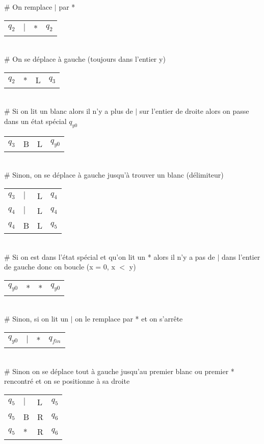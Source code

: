 \documentclass{article}
\begin{document}
\# On remplace $|$ par *

\begin{tabular}{llll}
$q_2$ & $|$ & * & $q_2$
\end{tabular}\\

\# On se déplace à gauche (toujours dans l'entier y)

\begin{tabular}{llll}
$q_2$ & * & L & $q_3$
\end{tabular}\\

\# Si on lit un blanc alors il n'y a plus de $|$ sur l'entier de droite alors on passe dans un état spécial $q_{y0}$ 

\begin{tabular}{llll}
$q_3$ & B & L & $q_{y0}$
\end{tabular}\\

\# Sinon, on se déplace à gauche jusqu'à trouver un blanc (délimiteur)

\begin{tabular}{llll}
$q_3$ & $|$ & L & $q_4$ \\
$q_4$ & $|$ & L & $q_4$ \\
$q_4$ & B & L & $q_5$
\end{tabular}\\

\# Si on est dans l'état spécial et qu'on lit un * alors il n'y a pas de $|$ dans l'entier de gauche donc on boucle (x = 0, x $<$ y)

\begin{tabular}{llll}
$q_{y0}$ & * & * & $q_{y0}$
\end{tabular}\\

\# Sinon, si on lit un $|$ on le remplace par * et on s'arrête

\begin{tabular}{llll}
$q_{y0}$ & $|$ & * & $q_{fin}$
\end{tabular}\\

\# Sinon on se déplace tout à gauche jusqu'au premier blanc ou premier * rencontré et on se positionne à sa droite

\begin{tabular}{llll}
$q_5$ & $|$ & L & $q_5$ \\
$q_5$ & B & R & $q_6$ \\
$q_5$ & * & R & $q_6$
\end{tabular}\\
\end{document}
